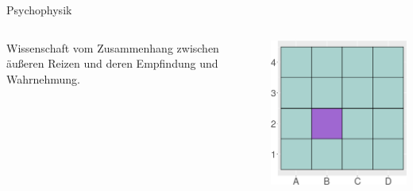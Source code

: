 \documentclass{beamer}
\begin{document}
\begin{frame}{Psychophysik}

\begin{columns}[c]

\begin{column}{5cm}

Wissenschaft vom Zusammenhang zwischen äußeren Reizen und deren Empfindung und Wahrnehmung.


\end{column}


\begin{column}{5cm}
\begin{center}
    \includegraphics[width=\textwidth]{color_test_screenshot_3.png}
\end{center}
\end{column}


\end{columns}
    
\end{frame}
\end{document}
